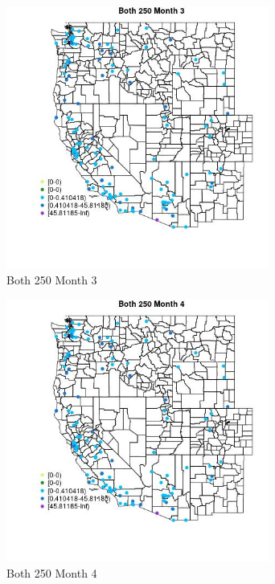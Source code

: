 \begin{figure} 
\centering  
\includegraphics[width=0.77\textwidth]{Code_Outputs/Report_ML_input_PM25_Step4_part_e_de_duplicated_aves_MapObsMo3Both_250.jpg} 
\caption{\label{fig:Report_ML_input_PM25_Step4_part_e_de_duplicated_avesMapObsMo3Both_250}Both 250 Month 3} 
\end{figure} 
 

\begin{figure} 
\centering  
\includegraphics[width=0.77\textwidth]{Code_Outputs/Report_ML_input_PM25_Step4_part_e_de_duplicated_aves_MapObsMo4Both_250.jpg} 
\caption{\label{fig:Report_ML_input_PM25_Step4_part_e_de_duplicated_avesMapObsMo4Both_250}Both 250 Month 4} 
\end{figure} 
 

